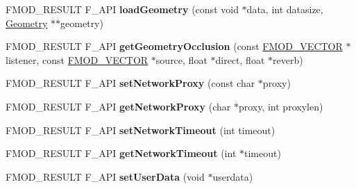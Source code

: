 \begin{DoxyCompactItemize}
\item 
F\+M\+O\+D\+\_\+\+R\+E\+S\+U\+LT F\+\_\+\+A\+PI {\bfseries load\+Geometry} (const void $\ast$data, int datasize, \hyperlink{class_f_m_o_d_1_1_geometry}{Geometry} $\ast$$\ast$geometry)\hypertarget{class_f_m_o_d_1_1_system_af9aa1402e3132a854037625ea6fabd4e}{}\label{class_f_m_o_d_1_1_system_af9aa1402e3132a854037625ea6fabd4e}

\item 
F\+M\+O\+D\+\_\+\+R\+E\+S\+U\+LT F\+\_\+\+A\+PI {\bfseries get\+Geometry\+Occlusion} (const \hyperlink{struct_f_m_o_d___v_e_c_t_o_r}{F\+M\+O\+D\+\_\+\+V\+E\+C\+T\+OR} $\ast$listener, const \hyperlink{struct_f_m_o_d___v_e_c_t_o_r}{F\+M\+O\+D\+\_\+\+V\+E\+C\+T\+OR} $\ast$source, float $\ast$direct, float $\ast$reverb)\hypertarget{class_f_m_o_d_1_1_system_ac1c462ead8eef9cbb955a898cd1c64a9}{}\label{class_f_m_o_d_1_1_system_ac1c462ead8eef9cbb955a898cd1c64a9}

\item 
F\+M\+O\+D\+\_\+\+R\+E\+S\+U\+LT F\+\_\+\+A\+PI {\bfseries set\+Network\+Proxy} (const char $\ast$proxy)\hypertarget{class_f_m_o_d_1_1_system_ab1368bd2bd2bcba58d4c70c385277bd1}{}\label{class_f_m_o_d_1_1_system_ab1368bd2bd2bcba58d4c70c385277bd1}

\item 
F\+M\+O\+D\+\_\+\+R\+E\+S\+U\+LT F\+\_\+\+A\+PI {\bfseries get\+Network\+Proxy} (char $\ast$proxy, int proxylen)\hypertarget{class_f_m_o_d_1_1_system_a6346a910caaff928a7498f2bfeaf8a69}{}\label{class_f_m_o_d_1_1_system_a6346a910caaff928a7498f2bfeaf8a69}

\item 
F\+M\+O\+D\+\_\+\+R\+E\+S\+U\+LT F\+\_\+\+A\+PI {\bfseries set\+Network\+Timeout} (int timeout)\hypertarget{class_f_m_o_d_1_1_system_aad7cb557e4992666cfc304dfbac6d04e}{}\label{class_f_m_o_d_1_1_system_aad7cb557e4992666cfc304dfbac6d04e}

\item 
F\+M\+O\+D\+\_\+\+R\+E\+S\+U\+LT F\+\_\+\+A\+PI {\bfseries get\+Network\+Timeout} (int $\ast$timeout)\hypertarget{class_f_m_o_d_1_1_system_aaabd940cb1f8768ae35bf68782d72ab6}{}\label{class_f_m_o_d_1_1_system_aaabd940cb1f8768ae35bf68782d72ab6}

\item 
F\+M\+O\+D\+\_\+\+R\+E\+S\+U\+LT F\+\_\+\+A\+PI {\bfseries set\+User\+Data} (void $\ast$userdata)\hypertarget{class_f_m_o_d_1_1_system_ab2f36a02a4badbc4fc4727f37f62b7c3}{}\label{class_f_m_o_d_1_1_system_ab2f36a02a4badbc4fc4727f37f62b7c3}


\end{DoxyCompactItemize}
